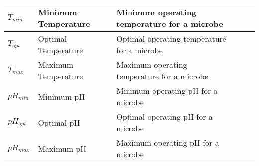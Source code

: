 \begin{table}[ht!]
\begin{tabular}{|l|p{3.5cm}|p{4cm}|l|l|l|}
        $T_{min}$ & Minimum Temperature & Minimum operating temperature for a microbe &  &  & \\ \hline
        $T_{opt}$& Optimal Temperature & Optimal operating temperature for a microbe &  &  & \\ \hline
        $T_{max}$& Maximum Temperature & Maximum operating temperature for a microbe &  &  & \\ \hline
        $pH_{min}$& Minimum pH & Minimum operating pH for a microbe &  &  & \\ \hline
        $pH_{opt}$& Optimal pH & Optimal operating pH for a microbe &  &  & \\ \hline
        $pH_{max}$& Maximum pH & Maximum operating pH for a microbe &  &  & \\ \hline
    \end{tabular}
\end{table}